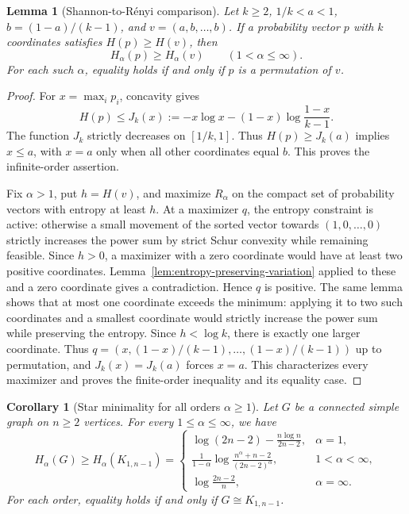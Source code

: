 \documentclass[11pt,a4paper,reqno]{amsart}
\newtheorem{lemma}[theorem]{Lemma}
\newtheorem{corollary}[theorem]{Corollary}
\theoremstyle{remark}
\numberwithin{equation}{section}
\begin{document}
\begin{lemma}[Shannon-to-R\'enyi comparison]
\label{lem:shannon-renyi-transfer}
Let $k\ge2$, $1/k<a<1$, $b=(1-a)/(k-1)$, and
$v=(a,b,\ldots,b)$. If a probability vector $p$ with $k$ coordinates satisfies
$H(p)\ge H(v)$, then
\[
 H_\alpha(p)\ge H_\alpha(v)\qquad(1<\alpha\le\infty).
\]
For each such $\alpha$, equality holds if and only if $p$ is a
permutation of $v$.
\end{lemma}
\begin{proof}
For $x=\max_i p_i$, concavity gives
\[
 H(p)\le J_k(x):=-x\log x-(1-x)\log\frac{1-x}{k-1}.
\]
The function $J_k$ strictly decreases on $[1/k,1]$. Thus
$H(p)\ge J_k(a)$ implies $x\le a$, with $x=a$ only when all other
coordinates equal $b$. This proves the infinite-order assertion.

Fix $\alpha>1$, put $h=H(v)$, and maximize $R_\alpha$ on the
compact set of probability vectors with entropy at least $h$.
At a maximizer $q$, the entropy constraint is active: otherwise a
small movement of the sorted vector towards $(1,0,\ldots,0)$
strictly increases the power sum by strict Schur convexity while
remaining feasible.
Since $h>0$, a maximizer with a zero coordinate would have at least
two positive coordinates. Lemma~\ref{lem:entropy-preserving-variation}
applied to these and a zero coordinate gives a contradiction.
Hence $q$ is positive. The same lemma shows that at most one
coordinate exceeds the minimum: applying it to two such coordinates
and a smallest coordinate would strictly increase the power sum while
preserving the entropy. Since $h<\log k$, there is exactly
one larger coordinate. Thus $q=(x,(1-x)/(k-1),\ldots,(1-x)/(k-1))$
up to permutation, and $J_k(x)=J_k(a)$ forces $x=a$.
This characterizes every maximizer and proves the finite-order
inequality and its equality case.
\end{proof}

\begin{corollary}[Star minimality for all orders $\alpha\ge1$]
\label{cor:all-renyi-star}
Let $G$ be a connected simple graph on $n\ge2$ vertices. For every
$1\le\alpha\le\infty$, we have
\[
 H_\alpha(G)\ge H_\alpha(K_{1,n-1})=
 \begin{cases}
 \displaystyle\log(2n-2)-\frac{n\log n}{2n-2},&\alpha=1,\\[6pt]
 \displaystyle\frac{1}{1-\alpha}
       \log\frac{n^\alpha+n-2}{(2n-2)^\alpha},&1<\alpha<\infty,\\[6pt]
 \displaystyle\log\frac{2n-2}{n},&\alpha=\infty.
 \end{cases}
\]
For each order, equality holds if and only if $G\cong K_{1,n-1}$.
\end{corollary}
\end{document}
